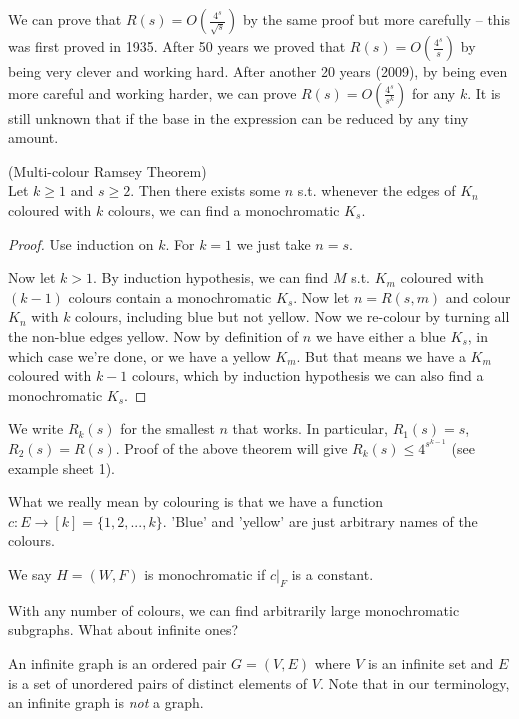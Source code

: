 \documentclass[a4paper]{article}
\begin{document}
We can prove that $R(s) = O\left(\frac{4^s}{\sqrt{s}}\right)$ by the same proof but more carefully -- this was first proved in 1935. After 50 years we proved that $R(s) = O\left(\frac{4^s}{s}\right)$ by being very clever and working hard. After another 20 years (2009), by being even more careful and working harder, we can prove $R(s) = O\left(\frac{4^s}{s^k}\right)$ for any $k$. It is still unknown that if the base in the expression can be reduced by any tiny amount.

\begin{thm} (Multi-colour Ramsey Theorem)\\
Let $k \geq 1$ and $s \geq 2$. Then there exists some $n$ s.t. whenever the edges of $K_n$ coloured with $k$ colours, we can find a monochromatic $K_s$.
\begin{proof}
Use induction on $k$. For $k=1$ we just take $n=s$.

Now let $k>1$. By induction hypothesis, we can find $M$ s.t. $K_m$ coloured with $(k-1)$ colours contain a monochromatic $K_s$. Now let $n=R(s,m)$ and colour $K_n$ with $k$ colours, including blue but not yellow. Now we re-colour by turning all the non-blue edges yellow. Now by definition of $n$ we have either a blue $K_s$, in which case we're done, or we have a yellow $K_m$. But that means we have a $K_m$ coloured with $k-1$ colours, which by induction hypothesis we can also find a monochromatic $K_s$.
\end{proof}
\end{thm}

\begin{rem}
We write $R_k(s)$ for the smallest $n$ that works. In particular, $R_1(s) = s$, $R_2(s) = R(s)$. Proof of the above theorem will give $R_k(s) \leq 4^{s^{k-1}}$ (see example sheet 1).
\end{rem}

\begin{rem}
What we really mean by colouring is that we have a function $c:E \to [k] = \{1,2,...,k\}$. 'Blue' and 'yellow' are just arbitrary names of the colours.

We say $H=(W,F)$ is monochromatic if $c|_F$ is a constant.
\end{rem}

With any number of colours, we can find arbitrarily large monochromatic subgraphs. What about infinite ones?

\begin{defi}
An infinite graph is an ordered pair $G=(V,E)$ where $V$ is an infinite set and $E$ is a set of unordered pairs of distinct elements of $V$. Note that in our terminology, an infinite graph is \emph{not} a graph.
\end{defi}
\end{document}
